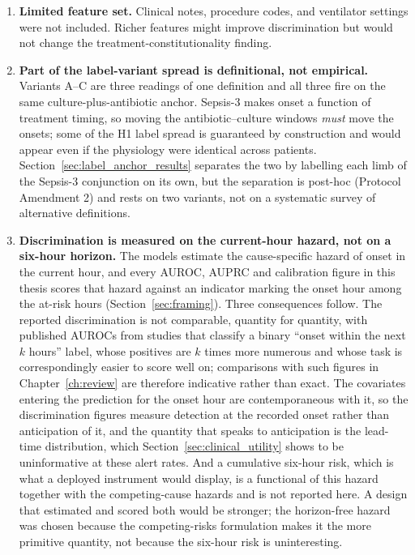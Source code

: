 \begin{enumerate}
    \item \textbf{Limited feature set.} Clinical notes, procedure codes, and
    ventilator settings were not included. Richer features might improve
    discrimination but would not change the treatment-constitutionality finding.

    \item \textbf{Part of the label-variant spread is definitional, not
    empirical.} Variants A--C are three readings of one definition and all
    three fire on the same culture-plus-antibiotic anchor. Sepsis-3 makes onset
    a function of treatment timing, so moving the antibiotic--culture windows
    \emph{must} move the onsets; some of the H1 label spread is guaranteed by
    construction and would appear even if the physiology were identical across
    patients. Section~\ref{sec:label_anchor_results} separates the two by
    labelling each limb of the Sepsis-3 conjunction on its own, but the
    separation is post-hoc (Protocol Amendment 2) and rests on two variants,
    not on a systematic survey of alternative definitions.

    \item \textbf{Discrimination is measured on the current-hour hazard, not on
    a six-hour horizon.} The models estimate the cause-specific hazard of onset
    in the current hour, and every AUROC, AUPRC and calibration figure in this
    thesis scores that hazard against an indicator marking the onset hour among
    the at-risk hours (Section~\ref{sec:framing}). Three consequences follow.
    The reported discrimination is not comparable, quantity for quantity, with
    published AUROCs from studies that classify a binary ``onset within the next
    $k$ hours'' label, whose positives are $k$ times more numerous and whose task
    is correspondingly easier to score well on; comparisons with such figures in
    Chapter~\ref{ch:review} are therefore indicative rather than exact. The
    covariates entering the prediction for the onset hour are contemporaneous
    with it, so the discrimination figures measure detection at the recorded
    onset rather than anticipation of it, and the quantity that speaks to
    anticipation is the lead-time distribution, which
    Section~\ref{sec:clinical_utility} shows to be uninformative at these alert
    rates. And a cumulative six-hour risk, which is what a deployed instrument
    would display, is a functional of this hazard together with the
    competing-cause hazards and is not reported here. A design that estimated
    and scored both would be stronger; the horizon-free hazard was chosen
    because the competing-risks formulation makes it the more primitive
    quantity, not because the six-hour risk is uninteresting.


\end{enumerate}
